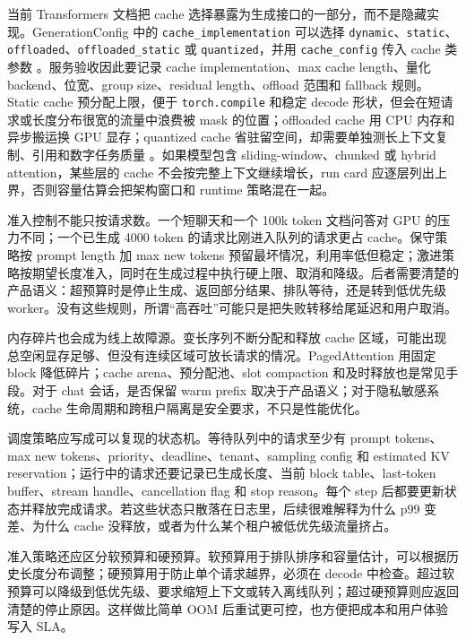 \documentclass[UTF8,zihao=-4,openany]{ctexbook}
\begin{document}
当前 Transformers 文档把 cache 选择暴露为生成接口的一部分，而不是隐藏实现。GenerationConfig 中的 \texttt{cache\_implementation} 可以选择 \texttt{dynamic}、\texttt{static}、\texttt{offloaded}、\texttt{offloaded\_static} 或 \texttt{quantized}，并用 \texttt{cache\_config} 传入 cache 类参数 \cite{huggingface2026transformersgeneration}。服务验收因此要记录 cache implementation、max cache length、量化 backend、位宽、group size、residual length、offload 范围和 fallback 规则。Static cache 预分配上限，便于 \texttt{torch.compile} 和稳定 decode 形状，但会在短请求或长度分布很宽的流量中浪费被 mask 的位置；offloaded cache 用 CPU 内存和异步搬运换 GPU 显存；quantized cache 省驻留空间，却需要单独测长上下文复制、引用和数字任务质量 \cite{huggingface2026transformerskvcache,huggingface2026transformersllmoptims}。如果模型包含 sliding-window、chunked 或 hybrid attention，某些层的 cache 不会按完整上下文继续增长，run card 应逐层列出上界，否则容量估算会把架构窗口和 runtime 策略混在一起。

准入控制不能只按请求数。一个短聊天和一个 100k token 文档问答对 GPU 的压力不同；一个已生成 4000 token 的请求比刚进入队列的请求更占 cache。保守策略按 prompt length 加 max new tokens 预留最坏情况，利用率低但稳定；激进策略按期望长度准入，同时在生成过程中执行硬上限、取消和降级。后者需要清楚的产品语义：超预算时是停止生成、返回部分结果、排队等待，还是转到低优先级 worker。没有这些规则，所谓“高吞吐”可能只是把失败转移给尾延迟和用户取消。

内存碎片也会成为线上故障源。变长序列不断分配和释放 cache 区域，可能出现总空闲显存足够、但没有连续区域可放长请求的情况。PagedAttention 用固定 block 降低碎片；cache arena、预分配池、slot compaction 和及时释放也是常见手段。对于 chat 会话，是否保留 warm prefix 取决于产品语义；对于隐私敏感系统，cache 生命周期和跨租户隔离是安全要求，不只是性能优化。

调度策略应写成可以复现的状态机。等待队列中的请求至少有 prompt tokens、max new tokens、priority、deadline、tenant、sampling config 和 estimated KV reservation；运行中的请求还要记录已生成长度、当前 block table、last-token buffer、stream handle、cancellation flag 和 stop reason。每个 step 后都要更新状态并释放完成请求。若这些状态只散落在日志里，后续很难解释为什么 p99 变差、为什么 cache 没释放，或者为什么某个租户被低优先级流量挤占。

准入策略还应区分软预算和硬预算。软预算用于排队排序和容量估计，可以根据历史长度分布调整；硬预算用于防止单个请求越界，必须在 decode 中检查。超过软预算可以降级到低优先级、要求缩短上下文或转入离线队列；超过硬预算则应返回清楚的停止原因。这样做比简单 OOM 后重试更可控，也方便把成本和用户体验写入 SLA。
\end{document}
